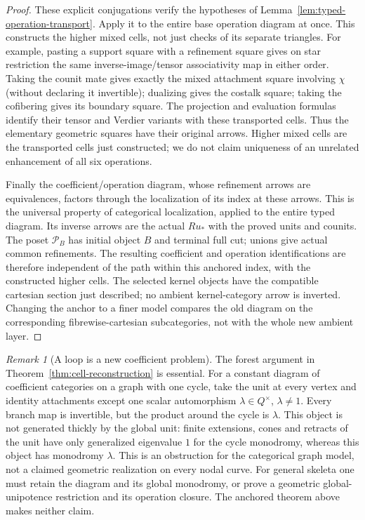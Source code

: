 \documentclass[11pt]{article}
\theoremstyle{definition}
\theoremstyle{remark}
\newtheorem{remark}[theorem]{Remark}
\begin{document}
\begin{proof}
These explicit conjugations verify the hypotheses of
Lemma~\ref{lem:typed-operation-transport}.  Apply it to the entire
base operation diagram at once.  This constructs the higher mixed cells,
not just checks of its separate triangles.  For example, pasting a
support square with a refinement square gives on star restriction the
same inverse-image/tensor associativity map in either order.  Taking
the counit mate gives exactly the mixed attachment square involving
$\chi$ (without declaring it invertible); dualizing gives
the costalk square; taking the cofibering gives its boundary square.
The projection and evaluation formulas identify their tensor and
Verdier variants with these transported cells.  Thus the elementary
geometric squares have their original arrows.  Higher mixed cells are
the transported cells just constructed; we do not claim uniqueness of
an unrelated enhancement of all six operations.

Finally the coefficient/operation diagram, whose refinement arrows
are equivalences, factors
through the localization of its index at these arrows.  This is the
universal property of categorical localization, applied to the entire
typed diagram.  Its inverse arrows are the actual $Ru_*$ with the
proved units and counits.  The poset $\mathcal P_B$ has initial object
$B$ and terminal full cut; unions give actual common refinements.
The resulting coefficient and operation identifications are therefore
independent of the path within this anchored index, with the constructed
higher cells.  The selected kernel objects have the compatible cartesian
section just described; no ambient kernel-category arrow is inverted.  Changing
the anchor to a finer model compares the old diagram on the corresponding
fibrewise-cartesian subcategories, not with the whole new ambient layer.
\end{proof}

\begin{remark}[A loop is a new coefficient problem]
\label{rem:loop-monodromy-gate}
The forest argument in Theorem~\ref{thm:cell-reconstruction} is essential.
For a constant diagram of coefficient categories on a graph with one
cycle, take the unit at every vertex and identity attachments except
one scalar automorphism $\lambda\in Q^\times$, $\lambda\ne1$.
Every branch map is invertible, but the product around the cycle is
$\lambda$.  This object is not generated thickly by the global unit:
finite extensions, cones and retracts of the unit have only generalized
eigenvalue $1$ for the cycle monodromy, whereas this object has
monodromy $\lambda$.  This is an obstruction for the categorical graph
model, not a claimed geometric realization on every nodal curve.
For general skeleta one must retain the diagram and its global
monodromy, or prove a geometric global-unipotence restriction and
its operation closure.  The anchored theorem above makes neither claim.
\end{remark}
\end{document}
